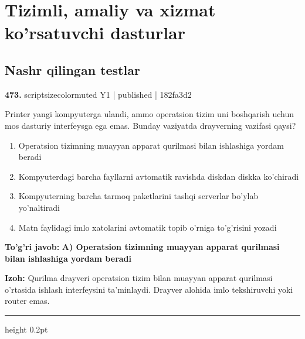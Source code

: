 \documentclass[10pt,a4paper]{article}
\begin{document}
\section{Tizimli, amaliy va xizmat ko'rsatuvchi dasturlar}
\subsection{Nashr qilingan testlar}

{\bfseries\sffamily\color{ink} 473.} {scriptsizecolor{muted} Y1 | published | 182fa3d2}
\par
Printer yangi kompyuterga ulandi, ammo operatsion tizim uni boshqarish uchun mos dasturiy interfeysga ega emas. Bunday vaziyatda drayverning vazifasi qaysi?
\begin{enumerate}[label=\Alph*),leftmargin=9mm]
\item Operatsion tizimning muayyan apparat qurilmasi bilan ishlashiga yordam beradi
\item Kompyuterdagi barcha fayllarni avtomatik ravishda diskdan diskka ko'chiradi
\item Kompyuterning barcha tarmoq paketlarini tashqi serverlar bo'ylab yo'naltiradi
\item Matn faylidagi imlo xatolarini avtomatik topib o'rniga to'g'risini yozadi
\end{enumerate}
\begin{tcolorbox}[enhanced,breakable,colback=teal!4,colframe=teal!60!black,boxrule=0.45pt,arc=1.2mm,left=2.7mm,right=2.7mm,top=1.8mm,bottom=1.8mm,before skip=2mm,after skip=2mm]
{\bfseries\sffamily\color{teal}To'g'ri javob:} \textbf{A) Operatsion tizimning muayyan apparat qurilmasi bilan ishlashiga yordam beradi}
\par\smallskip
{\bfseries Izoh:} Qurilma drayveri operatsion tizim bilan muayyan apparat qurilmasi o'rtasida ishlash interfeysini ta'minlaydi. Drayver alohida imlo tekshiruvchi yoki router emas.
\end{tcolorbox}
\vspace{2mm}\hrule height 0.2pt\vspace{3mm}
\end{document}
